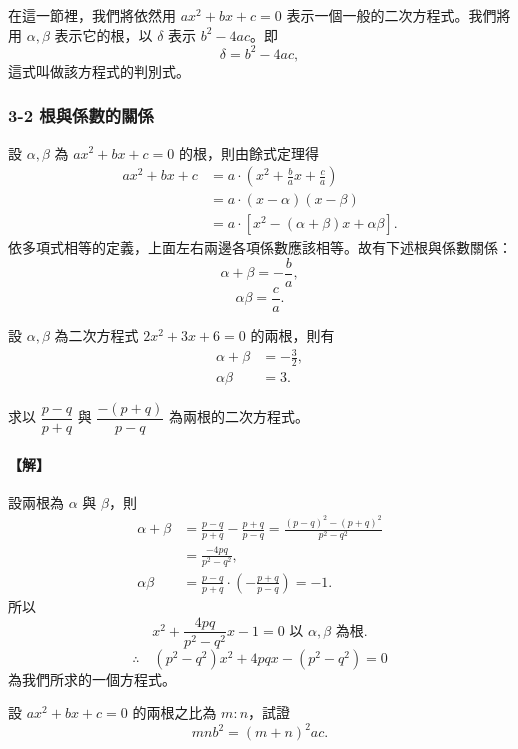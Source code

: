 在這一節裡，我們將依然用 $ax^2+bx+c=0$ 表示一個一般的二次方程式。我們將用 $\alpha, \beta$ 表示它的根，以 $\delta$ 表示 $b^2-4ac$。即
\[
\delta = b^2-4ac,
\]
這式叫做該方程式的判別式。

\subsubsection*{3-2 根與係數的關係}

設 $\alpha, \beta$ 為 $ax^2+bx+c=0$ 的根，則由餘式定理得
\begin{align*}
ax^2+bx+c &= a\cdot \left(x^2+\frac{b}{a}x+\frac{c}{a}\right) \\
&= a\cdot (x-\alpha)(x-\beta) \\
&= a\cdot [x^2-(\alpha+\beta)x+\alpha\beta].
\end{align*}
依多項式相等的定義，上面左右兩邊各項係數應該相等。故有下述根與係數關係：
\[
\alpha+\beta = -\frac{b}{a},
\]
\[
\alpha\beta = \frac{c}{a}.
\]

\begin{example}\label{ex:b2_1-3-1}
設 $\alpha, \beta$ 為二次方程式 $2x^2+3x+6=0$ 的兩根，則有
\begin{align*}
\alpha+\beta &= -\frac{3}{2}, \\
\alpha\beta &= 3.
\end{align*}
\end{example}

\begin{example}\label{ex:b2_1-3-2}
求以 $\dfrac{p-q}{p+q}$ 與 $\dfrac{-(p+q)}{p-q}$ 為兩根的二次方程式。
\end{example}
\paragraph{【解】}
設兩根為 $\alpha$ 與 $\beta$，則
\begin{align*}
\alpha+\beta &= \frac{p-q}{p+q} - \frac{p+q}{p-q} = \frac{(p-q)^2 - (p+q)^2}{p^2-q^2} \\
&= \frac{-4pq}{p^2-q^2}, \\
\alpha\beta &= \frac{p-q}{p+q} \cdot \left(-\frac{p+q}{p-q}\right) = -1.
\end{align*}
所以
\[
x^2 + \frac{4pq}{p^2-q^2}x - 1 = 0 \text{ 以 } \alpha, \beta \text{ 為根}.
\]
\[
\therefore \quad (p^2-q^2)x^2 + 4pqx - (p^2-q^2) = 0
\]
為我們所求的一個方程式。


\begin{example}\label{ex:b2_1-3-3}
設 $ax^2+bx+c=0$ 的兩根之比為 $m:n$，試證
\[
mnb^2 = (m+n)^2 ac.
\]
\end{example}
